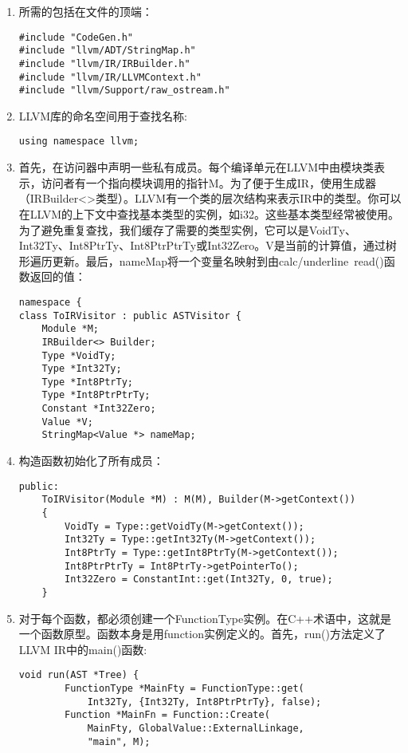 \begin{enumerate}
\item 所需的包括在文件的顶端：
\begin{lstlisting}[caption={}]
#include "CodeGen.h"
#include "llvm/ADT/StringMap.h"
#include "llvm/IR/IRBuilder.h"
#include "llvm/IR/LLVMContext.h"
#include "llvm/Support/raw_ostream.h"
\end{lstlisting}

\item LLVM库的命名空间用于查找名称:
\begin{lstlisting}[caption={}]
using namespace llvm;
\end{lstlisting}

\item 首先，在访问器中声明一些私有成员。每个编译单元在LLVM中由模块类表示，访问者有一个指向模块调用的指针M。为了便于生成IR，使用生成器（IRBuilder<>类型）。LLVM有一个类的层次结构来表示IR中的类型。你可以在LLVM的上下文中查找基本类型的实例，如i32。这些基本类型经常被使用。为了避免重复查找，我们缓存了需要的类型实例，它可以是VoidTy、Int32Ty、Int8PtrTy、Int8PtrPtrTy或Int32Zero。V是当前的计算值，通过树形遍历更新。最后，nameMap将一个变量名映射到由calc/underline{~}read()函数返回的值：
\begin{lstlisting}[caption={}]
namespace {
class ToIRVisitor : public ASTVisitor {
	Module *M;
	IRBuilder<> Builder;
	Type *VoidTy;
	Type *Int32Ty;
	Type *Int8PtrTy;
	Type *Int8PtrPtrTy;
	Constant *Int32Zero;
	Value *V;
	StringMap<Value *> nameMap;
\end{lstlisting}

\item 构造函数初始化了所有成员：
\begin{lstlisting}[caption={}]
public:
	ToIRVisitor(Module *M) : M(M), Builder(M->getContext())
	{
		VoidTy = Type::getVoidTy(M->getContext());
		Int32Ty = Type::getInt32Ty(M->getContext());
		Int8PtrTy = Type::getInt8PtrTy(M->getContext());
		Int8PtrPtrTy = Int8PtrTy->getPointerTo();
		Int32Zero = ConstantInt::get(Int32Ty, 0, true);
	}
\end{lstlisting}

\item 对于每个函数，都必须创建一个FunctionType实例。在C++术语中，这就是一个函数原型。函数本身是用function实例定义的。首先，run()方法定义了LLVM IR中的main()函数:
\begin{lstlisting}[caption={}]
	void run(AST *Tree) {
		FunctionType *MainFty = FunctionType::get(
			Int32Ty, {Int32Ty, Int8PtrPtrTy}, false);
		Function *MainFn = Function::Create(
			MainFty, GlobalValue::ExternalLinkage,
			"main", M);
\end{lstlisting}


\end{enumerate}
